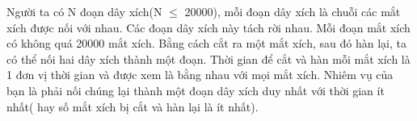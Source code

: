 Người ta có N đoạn dây xích(N  $\le$  20000), mỗi đoạn dây xích là  chuỗi các mắt xích được nối với nhau. Các đoạn dây xích này tách rời nhau. Mỗi đoạn mắt xích có không quá 20000 mắt xích.  Bằng cách cắt ra một mắt xích, sau đó hàn lại, ta có thể nối hai dây xích thành một đoạn. Thời gian để cắt và hàn mỗi mắt xích là 1 đơn vị thời gian và được xem là bằng nhau với mọi mắt xích.  Nhiêm vụ của bạn là phải nối chúng lại thành một đoạn dây xích duy nhất với thời gian ít nhất( hay số mắt xích bị cắt và hàn lại là ít nhất).  

\